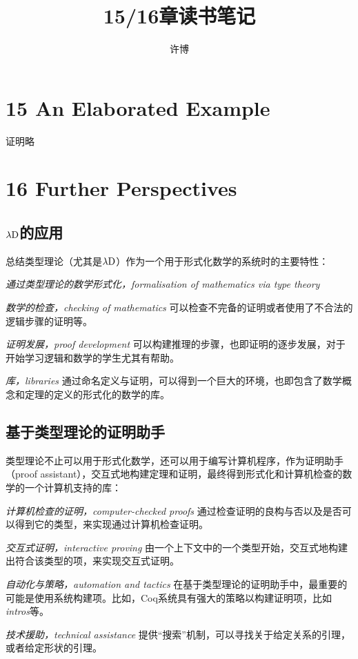 \documentclass[UTF8]{article}
\title{15/16章读书笔记}
\author{许博}
\date{}
\begin{document}
\maketitle

\newpage
\section{15 An Elaborated Example}
	证明略
	
\newpage
\section{16 Further Perspectives}
	\subsection{$\lambda{\rm D}$的应用}
	\noindent
	总结类型理论（尤其是$\lambda{\rm D}$）作为一个用于形式化数学的系统时的主要特性：
	
		\textit{通过类型理论的数学形式化，formalisation of mathematics via type theory}
		
		\textit{数学的检查，checking of mathematics} 可以检查不完备的证明或者使用了不合法的逻辑步骤的证明等。
		
		\textit{证明发展，proof development} 可以构建推理的步骤，也即证明的逐步发展，对于开始学习逻辑和数学的学生尤其有帮助。
		
		\textit{库，libraries} 通过命名定义与证明，可以得到一个巨大的环境，也即包含了数学概念和定理的定义的形式化的数学的库。
	
	\subsection{基于类型理论的证明助手}
	\noindent
	类型理论不止可以用于形式化数学，还可以用于编写计算机程序，作为证明助手（proof assistant），交互式地构建定理和证明，最终得到形式化和计算机检查的数学的一个计算机支持的库：
	
		\textit{计算机检查的证明，computer-checked proofs} 通过检查证明的良构与否以及是否可以得到它的类型，来实现通过计算机检查证明。
		
		\textit{交互式证明，interactive proving} 由一个上下文中的一个类型开始，交互式地构建出符合该类型的项，来实现交互式证明。
		
		\textit{自动化与策略，automation and tactics} 在基于类型理论的证明助手中，最重要的可能是使用系统构建项。比如，Coq系统具有强大的策略以构建证明项，比如\textit{intros}等。
		
		\textit{技术援助，technical assistance} 提供“搜索”机制，可以寻找关于给定关系的引理，或者给定形状的引理。
		
\end{document}
